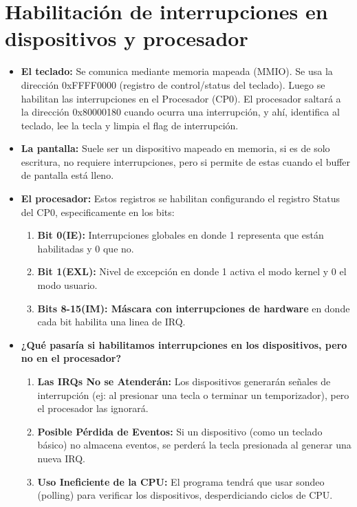 \documentclass{article}
\begin{document}
\section*{Habilitación de interrupciones en dispositivos y procesador}

\begin{itemize}
    \item \textbf{El teclado: } Se comunica mediante memoria mapeada (MMIO). Se usa la dirección 0xFFFF0000 (registro de control/status del teclado). Luego se habilitan las interrupciones en el Procesador (CP0). El procesador saltará a la dirección 0x80000180 cuando ocurra una interrupción, y ahí, identifica al teclado, lee la tecla y limpia el flag de interrupción.

    \item \textbf{La pantalla: }Suele ser un dispositivo mapeado en memoria, si es de solo escritura, no requiere interrupciones, pero si permite de estas cuando el buffer de pantalla está lleno.

    \item \textbf{El procesador: }Estos registros se habilitan configurando el registro Status del CP0, especificamente en los bits:

    \begin{enumerate}
        \item \textbf{Bit 0(IE): } Interrupciones globales en donde 1 representa que están habilitadas y 0 que no.

        \item \textbf{Bit 1(EXL): } Nivel de excepción en donde 1 activa el modo kernel y 0 el modo usuario.

        \item \textbf{Bits 8-15(IM): Máscara con interrupciones de hardware} en donde cada bit habilita una linea de IRQ.
    \end{enumerate}

    \item \textbf{¿Qué pasaría si habilitamos interrupciones en los dispositivos, pero no en el procesador?}

    \begin{enumerate}
        \item \textbf{Las IRQs No se Atenderán: }Los dispositivos generarán señales de interrupción (ej: al presionar una tecla o terminar un temporizador), pero el procesador las ignorará.
        \item \textbf{Posible Pérdida de Eventos: }Si un dispositivo (como un teclado básico) no almacena eventos, se perderá la tecla presionada al generar una nueva IRQ.
        \item \textbf{Uso Ineficiente de la CPU: }El programa tendrá que usar sondeo (polling) para verificar los dispositivos, desperdiciando ciclos de CPU.
    \end{enumerate}
\end{itemize}
\end{document}
